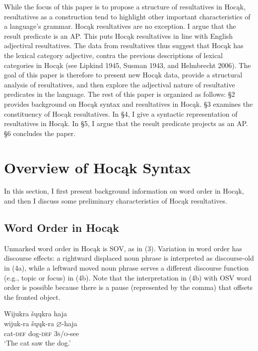 \documentclass[output=paper]{LSP/langsci}
\begin{document}
While the focus of this paper is to propose a structure of resultatives in Hocąk, resultatives as a construction tend to highlight other important characteristics of a language's grammar. Hocąk resultatives are no exception. I argue that the result predicate is an AP. This puts Hocąk resultatives in line with English adjectival resultatives. The data from resultatives
thus suggest that Hocąk has the lexical category adjective, contra the previous descriptions of lexical categories in Hocąk (see Lipkind 1945, Susman 1943, and Helmbrecht 2006). The goal of this paper is therefore to present new Hocąk data, provide a structural analysis of resultatives, and then explore the adjectival nature of resultative predicates in the language. The rest of this paper is organized as follows: \S 2 provides background on Hocąk syntax and resultatives in Hocąk. \S 3 examines the constituency of Hocąk resultatives. In \S 4, I give a syntactic representation of resultatives in Hocąk. In \S 5, I argue that the result predicate projects as an AP. \S 6 concludes the paper.

\section{Overview of Hocąk Syntax}

In this section, I first present background information on word order in Hocąk, and then I discuss some preliminary characteristics of Hocąk resultatives.

\subsection{Word Order in Hocąk}

Unmarked word order in Hocąk is SOV, as in (3). Variation in word order has discourse effects: a rightward displaced noun phrase is interpreted as discourse-old in (4a), while a leftward moved noun phrase serves a different discourse function (e.g., topic or focus) in (4b). Note that the interpretation in (4b) with OSV word order is possible because there is a pause (represented by the comma) that offsets the fronted object.

\begin{exe}

\ex \glll Wijukra šųųkra haja \\
 wijuk-ra šųųk-ra {$\varnothing$}-haja\\
cat-\textsc{def} dog-\textsc{def} \textsc{3s/o}-see\\
\glt `The cat saw the dog.'

\end{exe}
\end{document}
